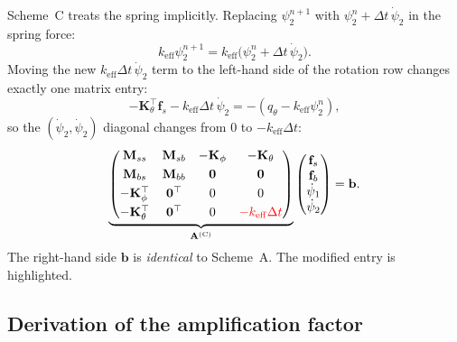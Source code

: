 \documentclass[11pt]{article}
\newcommand{\dt}{\Delta t}
\newcommand{\keff}{k_\mathrm{eff}}
\newcommand{\Kth}{\mathbf{K}_\theta}
\newcommand{\Mss}{\mathbf{M}_{ss}}
\newcommand{\highlight}[1]{\textcolor{red}{#1}}
\begin{document}
Scheme~C treats the spring implicitly.  Replacing $\psi_2^{n+1}$ with
$\psi_2^n+\dt\,\dot\psi_2$ in the spring force:
\[
  \keff\psi_2^{n+1} = \keff\bigl(\psi_2^n + \dt\,\dot\psi_2\bigr).
\]
Moving the new $\keff\dt\,\dot\psi_2$ term to the left-hand side of the
rotation row changes exactly one matrix entry:
\[
  -\Kth^\top\mathbf{f}_s - \keff\dt\,\dot\psi_2
  = -(q_\theta - \keff\psi_2^n),
\]
so the $(\dot\psi_2,\dot\psi_2)$ diagonal changes from $0$ to $-\keff\dt$:
%
\begin{equation}\label{eq:schemeC}
\underbrace{
\begin{pmatrix}
  \Mss & \mathbf{M}_{sb} & -\mathbf{K}_\phi & -\Kth \\[3pt]
  \mathbf{M}_{bs} & \mathbf{M}_{bb} & \mathbf{0} & \mathbf{0} \\[3pt]
  -\mathbf{K}_\phi^\top & \mathbf{0}^\top & 0 & 0 \\[3pt]
  -\Kth^\top & \mathbf{0}^\top & 0 & \highlight{-\keff\dt}
\end{pmatrix}
}_{\mathbf{A}^{(\mathrm{C})}}
\begin{pmatrix}\mathbf{f}_s\\\mathbf{f}_b\\\dot\psi_1\\\dot\psi_2\end{pmatrix}
=
\mathbf{b}.
\end{equation}
%
The right-hand side $\mathbf{b}$ is \emph{identical} to Scheme~A.
The modified entry is highlighted.

\subsection*{Derivation of the amplification factor}
\end{document}
